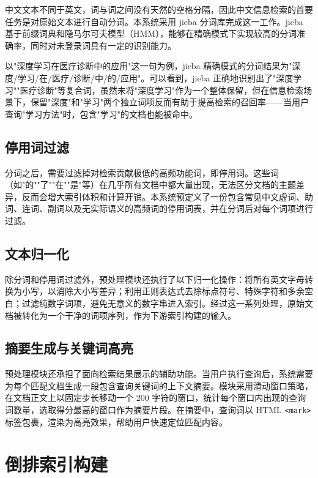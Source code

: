 \documentclass[12pt, a4paper]{ctexart}
\begin{document}
中文文本不同于英文，词与词之间没有天然的空格分隔，因此中文信息检索的首要任务是对原始文本进行自动分词。本系统采用 jieba 分词库完成这一工作。jieba 基于前缀词典和隐马尔可夫模型（HMM），能够在精确模式下实现较高的分词准确率，同时对未登录词具有一定的识别能力。

以"深度学习在医疗诊断中的应用"这一句为例，jieba 精确模式的分词结果为"深度/学习/在/医疗/诊断/中/的/应用"。可以看到，jieba 正确地识别出了"深度学习""医疗诊断"等复合词，虽然未将"深度学习"作为一个整体保留，但在信息检索场景下，保留"深度"和"学习"两个独立词项反而有助于提高检索的召回率——当用户查询"学习方法"时，包含"学习"的文档也能被命中。

\subsection{停用词过滤}

分词之后，需要过滤掉对检索贡献极低的高频功能词，即停用词。这些词（如"的""了""在""是"等）在几乎所有文档中都大量出现，无法区分文档的主题差异，反而会增大索引体积和计算开销。本系统预定义了一份包含常见中文虚词、助词、连词、副词以及无实际语义的高频词的停用词表，并在分词后对每个词项进行过滤。

\subsection{文本归一化}

除分词和停用词过滤外，预处理模块还执行了以下归一化操作：将所有英文字母转换为小写，以消除大小写差异；利用正则表达式去除标点符号、特殊字符和多余空白；过滤纯数字词项，避免无意义的数字串进入索引。经过这一系列处理，原始文档被转化为一个干净的词项序列，作为下游索引构建的输入。

\subsection{摘要生成与关键词高亮}

预处理模块还承担了面向检索结果展示的辅助功能。当用户执行查询后，系统需要为每个匹配文档生成一段包含查询关键词的上下文摘要。模块采用滑动窗口策略，在文档正文上以固定步长移动一个 200 字符的窗口，统计每个窗口内出现的查询词数量，选取得分最高的窗口作为摘要片段。在摘要中，查询词以 HTML \texttt{<mark>} 标签包裹，渲染为高亮效果，帮助用户快速定位匹配内容。


\section{倒排索引构建}
\end{document}
